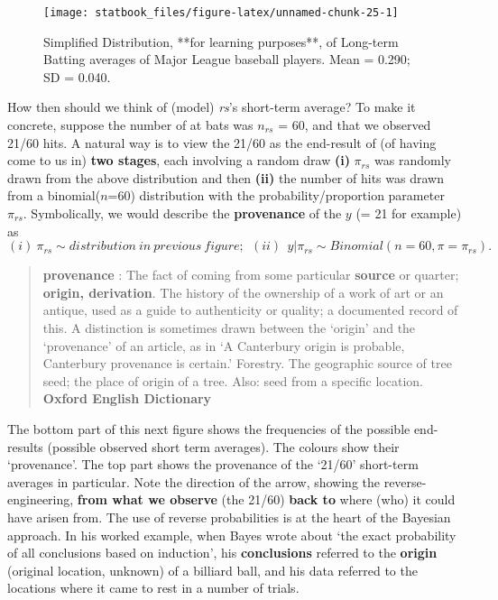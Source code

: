 \documentclass[]{book}
\begin{document}
\begin{figure}

{\centering \texttt{[image: statbook\_files/figure-latex/unnamed-chunk-25-1]} 

}

\caption{Simplified Distribution, **for learning purposes**, of Long-term Batting averages of Major League baseball players. Mean = 0.290; SD = 0.040.}\label{fig:unnamed-chunk-25}
\end{figure}

How then should we think of (model) \emph{rs}'s short-term average? To make it concrete, suppose the number of at bats was \(n_{rs}\) = 60, and that we observed 21/60 hits. A natural way is to view the 21/60 as the end-result of (of having come to us in) \textbf{two stages}, each involving a random draw \textbf{(i)} \(\pi_{rs}\) was randomly drawn from the above distribution and then \textbf{(ii)} the number of hits was drawn from a binomial(\(n\)=60) distribution with the probability/proportion parameter \(\pi_{rs}\). Symbolically, we would describe the \textbf{provenance} of the \(y\) (= 21 for example) as
\[(i) \ \pi_{rs} \sim distribution \ in \ previous \ figure ; \ \ (ii) \ \ y | \pi_{rs} \sim Binomial(n=60, \pi = \pi_{rs}).\]

\begin{quote}
\textbf{provenance} : The fact of coming from some particular \textbf{source} or quarter; \textbf{origin, derivation}.
The history of the ownership of a work of art or an antique, used as a guide to authenticity or quality; a documented record of this.
A distinction is sometimes drawn between the `origin' and the `provenance' of an article, as in `A Canterbury origin is probable, Canterbury provenance is certain.'
Forestry. The geographic source of tree seed; the place of origin of a tree. Also: seed from a specific location. \textbf{Oxford English Dictionary}
\end{quote}

The bottom part of this next figure shows the frequencies of the possible end-results (possible observed short term averages). The colours show their `provenance'. The top part shows the provenance of the `21/60' short-term averages in particular. Note the direction of the arrow, showing the reverse-engineering, \textbf{from what we observe} (the 21/60) \textbf{back to} where (who) it could have arisen from. The use of reverse probabilities is at the heart of the Bayesian approach. In his worked example, when Bayes wrote about `the exact probability of all conclusions based on induction', his \textbf{conclusions} referred to the \textbf{origin} (original location, unknown) of a billiard ball, and his data referred to the locations where it came to rest in a number of trials.
\end{document}
